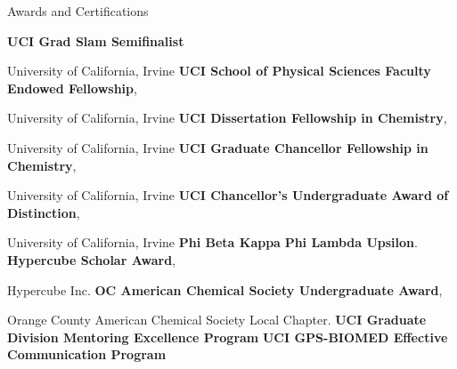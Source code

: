 \begin{rubric}{Awards and Certifications}

  \entry*[Feb 2022] \textbf{UCI Grad Slam Semifinalist}
  
  University of California, Irvine
  \entry*[Jun 2021] \textbf{UCI School of Physical Sciences Faculty Endowed Fellowship},

  University of California, Irvine
  \entry*[Jun 2021] \textbf{UCI Dissertation Fellowship in Chemistry},
  
  University of California, Irvine
  \entry*[Sept 2016] \textbf{UCI Graduate Chancellor Fellowship in Chemistry},
  
  University of California, Irvine
  \entry*[Jun 2015] \textbf{UCI Chancellor's Undergraduate Award of Distinction},
  
  University of California, Irvine
  \entry*[May 2015] \textbf{Phi Beta Kappa}
  \entry*[May 2015] \textbf{Phi Lambda Upsilon}.
  \entry*[Jun 2014] \textbf{Hypercube Scholar Award},
  
  Hypercube Inc.
  \entry*[Apr 2014] \textbf{OC American Chemical Society Undergraduate Award},
  
  Orange County American Chemical Society Local Chapter.
  \entry*[Mar 2020] \textbf{UCI Graduate Division Mentoring Excellence Program}
  \entry*[Jun 2017] \textbf{UCI GPS-BIOMED Effective Communication Program} 
\end{rubric}

